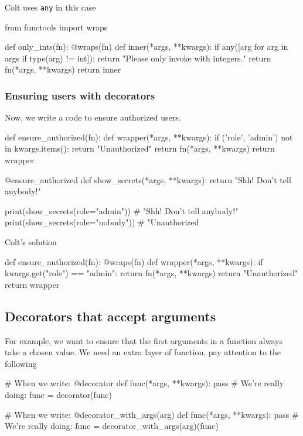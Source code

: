 Colt uses \verb|any| in this case 
\begin{listing}{1}
from functools import wraps

def only_ints(fn):
    @wraps(fn)
    def inner(*args, **kwargs):
        if any([arg for arg in args if type(arg) != int]):
            return "Please only invoke with integers."
        return fn(*args, **kwargs)
    return inner    
\end{listing}


\subsubsection{Ensuring users with decorators}

Now, we write a code to ensure authorized users. 
\begin{listing}{1}
def ensure_authorized(fn):
    def wrapper(*args, **kwargs):
        if ('role', 'admin') not in kwargs.items():
            return "Unauthorized"
        return fn(*args, **kwargs)
    return wrapper 

@ensure_authorized
def show_secrets(*args, **kwargs):
    return "Shh! Don't tell anybody!"

print(show_secrets(role="admin")) # "Shh! Don't tell anybody!"
print(show_secrets(role="nobody")) # "Unauthorized    
\end{listing}
Colt's solution 
\begin{listing}{1}
def ensure_authorized(fn):
    @wraps(fn)
    def wrapper(*args, **kwargs):
        if kwargs.get("role") == "admin":
            return fn(*args, **kwargs)
        return "Unauthorized"
    return wrapper    
\end{listing}


\subsection{Decorators that accept arguments} For example, we want to ensure that the first arguments in a function always take a chosen value. We need an extra layer of function, pay attention to the following 
\begin{listing}{1}
# When we write:
@decorator
def func(*args, **kwargs):
    pass
# We're really doing:
func = decorator(func)


# When we write:
@decorator_with_args(arg)
def func(*args, **kwargs):
    pass
# We're really doing:
func = decorator_with_args(arg)(func)    
\end{listing}

